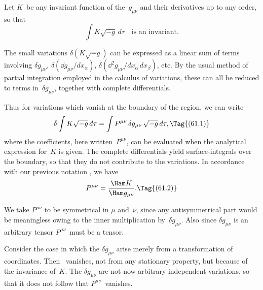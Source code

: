 \documentclass[12pt]{book}
\begin{document}

Let $K$~be any invariant function of the~$g_{\mu\nu}$ and their derivatives up to any
order, so that
\[
\int K \sqrt{-g}\, d\tau\quad\text{is an invariant.}
\]

The small variations $\delta(K \sqrt{-g})$ can be expressed as a linear sum of terms
involving $\delta g_{\mu\nu}$, $\delta(\dd g_{\mu\nu}/dx_{\alpha})$, $\delta(\dd^{2} g_{\mu\nu}/dx_{\alpha}\, dx_{\beta})$, etc. By the usual method of partial
integration employed in the calculus of variations, these can all be reduced to
terms in~$\delta g_{\mu\nu}$, together with complete differentials.

Thus for variations which vanish at the boundary of the region, we can
write
\[
\delta \int K \sqrt{-g}\, d\tau
= \int P^{\mu\nu}\, \delta g_{\mu\nu}\, \sqrt{-g}\, d\tau,
\Tag{(61.1)}
\]
where the coefficients, here written~$P^{\mu\nu}$, can be evaluated when the analytical
expression for~$K$ is given. The complete differentials yield surface\hyp{}integrals
over the boundary, so that they do not contribute to the variations. In
accordance with our previous notation , we have
\[
P^{\mu\nu} = \frac{\Ham K}{\Ham g_{\mu\nu}}.
\Tag{(61.2)}
\]

We take $P^{\mu\nu}$ to be symmetrical in $\mu$ and~$\nu$, since any antisymmetrical part
would be meaningless owing to the inner multiplication by~$\delta g_{\mu\nu}$. Also since
$\delta g_{\mu\nu}$ is an arbitrary tensor $P^{\mu\nu}$~must be a tensor.

Consider the case in which the $\delta g_{\mu\nu}$ arise merely from a transformation of
coordinates. Then ~vanishes, not from any stationary property, but
because of the invariance of~$K$. The $\delta g_{\mu\nu}$ are not now arbitrary independent
variations, so that it does not follow that $P^{\mu\nu}$~vanishes.
\end{document}
